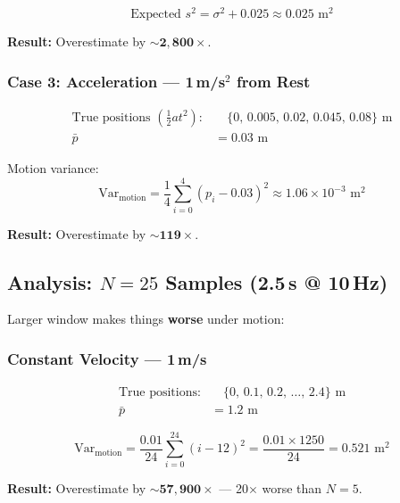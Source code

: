 \documentclass[11pt,a4paper]{article}
\begin{document}
\begin{equation}
    \text{Expected } s^2 = \sigma^2 + 0.025 \approx 0.025 \text{ m}^2
\end{equation}

\textbf{Result:} Overestimate by $\boldsymbol{\sim 2{,}800\times}$.

\subsubsection{Case 3: Acceleration --- 1\,m/s$^2$ from Rest}

\begin{align}
    \text{True positions } \left(\tfrac{1}{2}at^2\right): &\quad \{0,\, 0.005,\, 0.02,\, 0.045,\, 0.08\} \text{ m} \\
    \bar{p} &= 0.03 \text{ m}
\end{align}

Motion variance:
\begin{equation}
    \text{Var}_{\mathrm{motion}} = \frac{1}{4}\sum_{i=0}^{4}\left(p_i - 0.03\right)^2 \approx 1.06 \times 10^{-3} \text{ m}^2
\end{equation}

\textbf{Result:} Overestimate by $\boldsymbol{\sim 119\times}$.

\subsection{Analysis: $N = 25$ Samples (2.5\,s @ 10\,Hz)}

Larger window makes things \textbf{worse} under motion:

\subsubsection{Constant Velocity --- 1\,m/s}

\begin{align}
    \text{True positions:} &\quad \{0,\, 0.1,\, 0.2,\, \ldots,\, 2.4\} \text{ m} \\
    \bar{p} &= 1.2 \text{ m}
\end{align}

\begin{equation}
    \text{Var}_{\mathrm{motion}} = \frac{0.01}{24}\sum_{i=0}^{24}(i - 12)^2 = \frac{0.01 \times 1250}{24} = 0.521 \text{ m}^2
\end{equation}

\textbf{Result:} Overestimate by $\boldsymbol{\sim 57{,}900\times}$ --- 20$\times$ worse than $N=5$.
\end{document}
